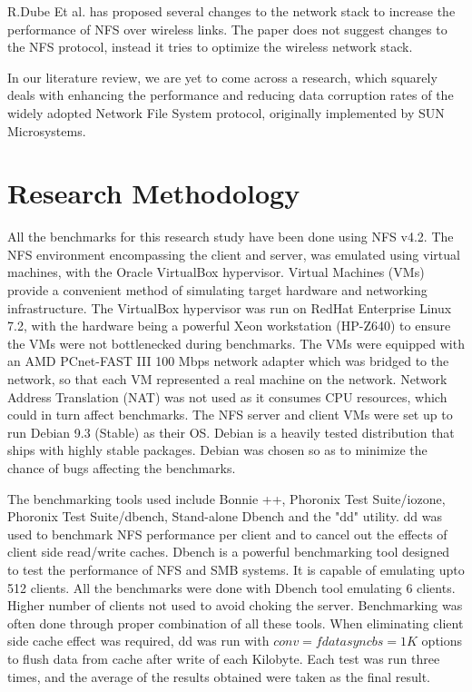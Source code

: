 \documentclass[conference]{IEEEtran}
\begin{document}
R.Dube Et al. has proposed several changes to the network stack to increase
the performance of NFS over wireless links\cite{b3}. The paper does not suggest
changes to the NFS protocol, instead it tries to optimize the wireless
network stack.

In our literature review, we are yet to come across a research, which
squarely deals with enhancing the performance and reducing data corruption
rates of the widely adopted Network File System protocol, originally
implemented by SUN Microsystems.

\section{Research Methodology}
All the benchmarks for this research study have been done using NFS v4.2.
The NFS environment encompassing the client and server, was emulated using
virtual machines, with the Oracle VirtualBox hypervisor. Virtual Machines 
(VMs) provide a convenient method of simulating target hardware and 
networking infrastructure. The VirtualBox hypervisor was run on RedHat 
Enterprise Linux 7.2, with the hardware being a powerful Xeon workstation
(HP-Z640) to ensure the VMs were not bottlenecked during benchmarks. The VMs
were equipped with an AMD PCnet-FAST III 100 Mbps network adapter which was
bridged to the network, so that each VM represented a real machine on the 
network. Network Address Translation (NAT) was not used as it consumes CPU
resources, which could in turn affect benchmarks. The NFS server and client
VMs were set up to run Debian 9.3 (Stable) as their OS. Debian is a heavily
tested distribution that ships with highly stable packages. Debian was 
chosen so as to minimize the chance of bugs affecting the benchmarks.

The benchmarking tools used include Bonnie ++, Phoronix Test Suite/iozone,
Phoronix Test Suite/dbench, Stand-alone Dbench and the "dd" utility. dd was
used to benchmark NFS performance per client and to cancel out the effects
of client side read/write caches. Dbench is a powerful benchmarking tool
designed to test the performance of NFS and SMB systems. It is capable of
emulating upto 512 clients. All the benchmarks were done with Dbench tool
emulating 6 clients. Higher number of clients not used to avoid choking the
server. Benchmarking was often done through proper combination of all these
tools. When eliminating client side cache effect was required, dd was run
with $conv=fdatasync bs=1K$ options to flush data from cache after write of
each Kilobyte. Each test was run three times, and the average of the results
obtained were taken as the final result.
\end{document}
